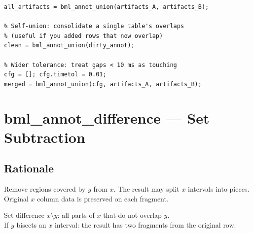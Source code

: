 \documentclass[11pt, a4paper]{article}
\begin{document}
\begin{lstlisting}[style=matlab]
% Merge artifact lists from two annotators
all_artifacts = bml_annot_union(artifacts_A, artifacts_B);

% Self-union: consolidate a single table's overlaps
% (useful if you added rows that now overlap)
clean = bml_annot_union(dirty_annot);

% Wider tolerance: treat gaps < 10 ms as touching
cfg = []; cfg.timetol = 0.01;
merged = bml_annot_union(cfg, artifacts_A, artifacts_B);
\end{lstlisting}

\section{bml\_annot\_difference --- Set Subtraction}
\label{sec:difference}

\subsection{Rationale}

Remove regions covered by $y$ from $x$. The result may split $x$ intervals into pieces. Original $x$ column data is preserved on each fragment.

\begin{formulabox}{Set difference}
$x \setminus y$: all parts of $x$ that do not overlap $y$.\\[3pt]
If $y$ bisects an $x$ interval: the result has two fragments from the original row.
\end{formulabox}
\end{document}
